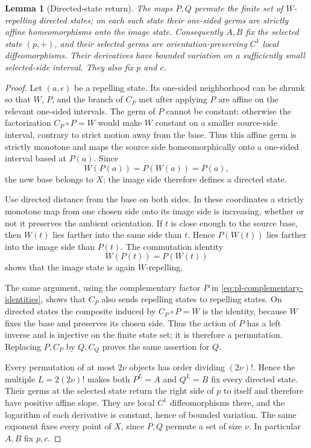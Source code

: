 \documentclass[11pt]{article}
\newtheorem{lemma}[theorem]{Lemma}
\theoremstyle{definition}
\theoremstyle{remark}
\begin{document}
\begin{lemma}[Directed-state return]\label{lem:pl-states}
The maps \(P,Q\) permute the finite set of \(W\)-repelling directed states;
on each such state their one-sided germs are strictly affine
homeomorphisms onto the image state.  Consequently \(A,B\) fix the selected
state \((p,+)\), and their selected germs are orientation-preserving \(C^1\)
local diffeomorphisms.  Their derivatives have bounded variation on a
sufficiently small selected-side interval.  They also fix \(p\) and \(c\).
\end{lemma}

\begin{proof}
Let $(a,\epsilon)$ be a repelling state.  Its one-sided neighborhood can be
shrunk so that \(W\), \(P\), and the branch of \(C_P\)
met after applying \(P\) are affine on the relevant one-sided intervals.
The germ of \(P\) cannot be constant: otherwise the factorization
\(C_P\circ P=W\) would make \(W\) constant on a smaller source-side
interval, contrary to strict motion away from the base.  Thus this affine
germ is strictly monotone and maps the source side homeomorphically onto a
one-sided interval based at \(P(a)\).  Since
\[
 W(P(a))=P(W(a))=P(a),
\]
the new base belongs to \(X\); the image side therefore defines a directed
state.

Use directed distance from the base on both sides.  In these coordinates a
strictly monotone map from one chosen side onto its image side is increasing,
whether or not it preserves the ambient orientation.  If \(t\) is close
enough to the source base, then \(W(t)\) lies farther into the same side than
\(t\).  Hence \(P(W(t))\) lies farther into the image side than \(P(t)\).
The commutation identity
\[
 W(P(t))=P(W(t))
\]
shows that the image state is again \(W\)-repelling.

The same argument, using the complementary factor $P$ in
\eqref{eq:pl-complementary-identities}, shows that $C_P$ also sends
repelling states to repelling states.  On directed states the composite
induced by \(C_P\circ P=W\) is the identity,
because \(W\) fixes the base and preserves its chosen side.  Thus the action
of \(P\) has a left inverse and is injective on the finite state set; it is
therefore a permutation.  Replacing \(P,C_P\) by
\(Q,C_Q\) proves the same assertion for \(Q\).

Every permutation of at most \(2\nu\) objects has order dividing
\((2\nu)!\).  Hence the multiple \(L=2(2\nu)!\) makes both \(P^L=A\)
and \(Q^L=B\) fix every directed state.  Their germs at the selected state
return the right side of \(p\) to itself and therefore have positive affine
slope.  They are local \(C^1\) diffeomorphisms there, and the logarithm of
each derivative is constant, hence of bounded variation.  The same exponent
fixes every point of \(X\), since \(P,Q\) permute a set of size \(\nu\).
In particular \(A,B\) fix \(p,c\).
\end{proof}
\end{document}
